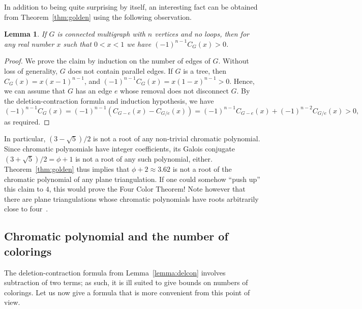 \documentclass[12pt,twoside,openright,a4paper]{book}
\newtheorem{lemma}[theorem]{Lemma}
\begin{document}
In addition to being quite surprising by itself, an interesting fact can be obtained from Theorem~\ref{thm:golden} using the following
observation.
\begin{lemma}\label{lemma:noroot}
If $G$ is connected multigraph with $n$ vertices and no loops, then for any real number $x$ such that $0<x<1$
we have $(-1)^{n-1}C_G(x)>0$.
\end{lemma}
\begin{proof}
We prove the claim by induction on the number of edges of $G$.  Without loss of generality, $G$ does not contain parallel edges.
If $G$ is a tree, then $C_G(x)=x(x-1)^{n-1}$, and $(-1)^{n-1}C_G(x)=x(1-x)^{n-1}>0$.  Hence, we can assume that
$G$ has an edge $e$ whose removal does not disconnect $G$.  By the deletion-contraction formula and induction hypothesis,
we have
$$(-1)^{n-1}C_G(x)=(-1)^{n-1}(C_{G-e}(x)-C_{G/e}(x))=(-1)^{n-1}C_{G-e}(x)+(-1)^{n-2}C_{G/e}(x)>0,$$
as required.
\end{proof}
In particular, $(3-\sqrt{5})/2$ is not a root of any non-trivial chromatic polynomial.  Since chromatic polynomials have integer coefficients,
its Galois conjugate $(3+\sqrt{5})/2=\phi+1$ is not a root of any such polynomial, either.  Theorem~\ref{thm:golden} thus implies that
$\phi+2\approx 3.62$ is not a root of the chromatic polynomial of any plane triangulation.  If one could somehow ``push up'' this claim to $4$,
this would prove the Four Color Theorem!  Note however that there are plane triangulations whose chromatic polynomials have roots
arbitrarily close to four~\cite{royle2008planar}.

\subsection{Chromatic polynomial and the number of colorings}

The deletion-contraction formula from Lemma~\ref{lemma:delcon} involves subtraction of two terms; as such, it
is ill suited to give bounds on numbers of colorings.  Let us now give a formula that is more convenient from
this point of view.
\end{document}
